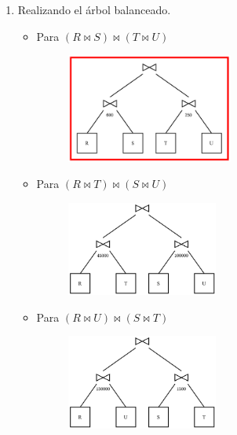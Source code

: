 \documentclass{templateNote}
\begin{document}
\begin{enumerate}
\begin{enumerate}[label=\arabic*)]
        \item Realizando el árbol balanceado.
        \begin{itemize}
            \item Para $(R \Join S) \Join (T \Join U)$
            \begin{figure}[H]
                \centering
                \includegraphics[width=0.55\textwidth]{img/E3-AB1.png}
            \end{figure}

            \item Para $(R \Join T) \Join (S \Join U)$
            \begin{figure}[H]
                \centering
                \includegraphics[width=0.5\textwidth]{img/E3-AB2.png}
            \end{figure}

            \newpage
            \item Para $(R \Join U) \Join (S \Join T)$
            \begin{figure}[H]
                \centering
                \includegraphics[width=0.5\textwidth]{img/E3-AB3.png}
            \end{figure}
        \end{itemize}
        

\end{enumerate}
\end{enumerate}
\end{document}
